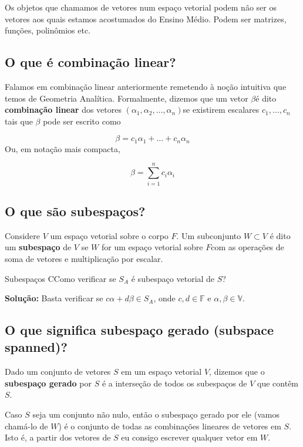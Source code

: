 \documentclass[12pt,a4paper]{article}
\begin{document}
Os objetos que chamamos de vetores num espaço vetorial podem não ser os vetores aos quais estamos acostumados do Ensino Médio. Podem ser matrizes, funções, polinômios etc.

\subsection{O que é combinação linear?}

Falamos em combinação linear anteriormente remetendo à noção intuitiva que temos de Geometria Analítica. Formalmente, dizemos que um vetor $\beta$​ é dito \textbf{combinação linear} dos vetores $(\alpha_1, \alpha_2, \ldots, \alpha_n)$​​ se existirem escalares $c_1, \ldots, c_n$ tais que $\beta$ pode ser escrito como

$$
\beta = c_1 \alpha_1 + \ldots + c_n \alpha_n
$$
Ou, em notação mais compacta,

$$
\beta = \sum_{i=1}^{n} c_i \alpha_i
$$

\subsection{O que são subespaços?}

Considere $V$ um espaço vetorial sobre o corpo $F$. Um subconjunto $W \subset V$ é dito um \textbf{subespaço} de $V$ se $W$ for um espaço vetorial sobre $F$​ com as operações de soma de vetores e multiplicação por escalar.

\begin{exemplo}{Subespaços}
CComo verificar se $S_A$ é subespaço vetorial de $S$?

\textbf{Solução:} Basta verificar se $c \alpha + d \beta \in S_A$, onde $c,d \in \mathbb{F}$ e $\alpha, \beta \in \mathbb{V}$​​.
\end{exemplo}

\subsection{O que significa subespaço gerado (subspace spanned)?}

Dado um conjunto de vetores $S$ em um espaço vetorial $V$, dizemos que o \textbf{subespaço gerado} por $S$ é a interseção de todos os subespaços de $V$ que contêm $S$.  

Caso $S$ seja um conjunto não nulo, então o subespaço gerado por ele (vamos chamá-lo de $W$) é o conjunto de todas as combinações lineares de vetores em $S$. Isto é, a partir dos vetores de $S$ eu consigo escrever qualquer vetor em $W$.
\end{document}
